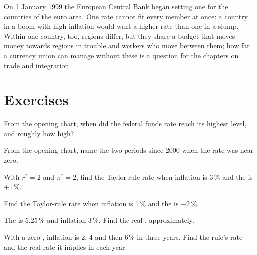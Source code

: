 On 1 January 1999 the European Central Bank began setting one  for the countries of the euro area. One rate cannot fit every member at once: a country in a boom
with high inflation would want a higher rate than one in a slump. Within one country, too, regions differ, but they share a budget that moves money towards regions in
trouble and workers who move between them; how far a currency union can manage without these is a question for the chapters on trade and integration.

\section{Exercises}

\begin{exercise}[$\star$]\label{exo:g12:monetary-policy:1}
From the opening chart, when did the federal funds rate reach its highest level, and roughly how high?
\end{exercise}

\begin{exercise}[$\star$]\label{exo:g12:monetary-policy:2}
From the opening chart, name the two periods since 2000 when the rate was near zero.
\end{exercise}

\begin{exercise}[$\star$]\label{exo:g12:monetary-policy:3}
With $r^* = 2$ and $\pi^* = 2$, find the Taylor-rule rate when inflation is 3\,\% and the  is $+1\,\%$.
\end{exercise}

\begin{exercise}[$\star$]\label{exo:g12:monetary-policy:4}
Find the Taylor-rule rate when inflation is 1\,\% and the  is $-2\,\%$.
\end{exercise}

\begin{exercise}[$\star$]\label{exo:g12:monetary-policy:5}
The  is 5.25\,\% and inflation 3\,\%. Find the real , approximately.
\end{exercise}

\begin{exercise}[$\star\star$]\label{exo:g12:monetary-policy:6}
With a zero , inflation is 2, 4 and then 6\,\% in three years. Find the rule's rate and the real rate it implies in each year.
\end{exercise}

